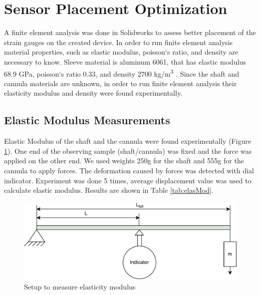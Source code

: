 \section{Sensor Placement Optimization}
\label{sec:SimMod}
A finite element analysis was done in Solidworks to assess better placement of the strain gauges on the created device. In order to run finite element analysis material properties, such as elastic modulus, poisson`s ratio, and density are necessary to know. Sleeve material is aluminum 6061, that has elastic modulus 68.9 GPa, poisson`s ratio 0.33, and density 2700 kg/m\textsuperscript{3} \cite{aluminum_properties}. Since the shaft and cannula materials are unknown, in order to run finite element analysis their elasticity modulus and density were found experimentally.
	
	\subsection{Elastic Modulus Measurements}
	\label{sec:ElasMod}
	Elastic Modulus of the shaft and the cannula were found experimentally (Figure \ref{fig:ElasModSet}). One end of the observing sample (shaft/cannula) was fixed and the force was applied on the other end. We used weights 250g for the shaft and 555g for the cannula to apply forces. The deformation caused by forces was detected with dial indicator. Experiment was done 5 times, average displacement value was used to calculate elastic modulus. Results are shown in Table \ref{tab:elasMod}.
	
\begin{figure}[h]
	\begin{center}
		\includegraphics[width=120mm]{fig/methods/el_mod_set.pdf}
	\end{center}
	\vspace{-4mm}
	\caption[Setup to measure elasticity modulus]
	{Setup to measure elasticity modulus}
	\label{fig:ElasModSet}
	\vspace{-2mm}
\end{figure}

